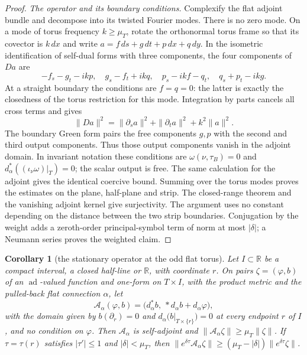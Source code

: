 \documentclass[11pt]{amsart}
\newtheorem{corollary}[theorem]{Corollary}
\theoremstyle{definition}
\theoremstyle{remark}
\theoremstyle{plain}
\numberwithin{equation}{section}
\newcommand{\RR}{\mathbb{R}}
\newcommand{\ad}{\operatorname{ad}}
\begin{document}
\begin{proof}
\emph{The operator and its boundary conditions.}
Complexify the flat adjoint bundle and decompose into its twisted
Fourier modes. There is no zero mode. On a mode of torus frequency
$k\ge\mu_T$, rotate the orthonormal torus frame so that its covector
is $k\,dx$ and write $a=f\,ds+g\,dt+p\,dx+q\,dy$.
In the isometric identification of self-dual forms with three
components, the four components of $Da$ are
\[
-f_s-g_t-ikp,\quad g_s-f_t+ikq,\quad
p_s-ikf-q_t,\quad q_s+p_t-ikg.
\]
At a straight boundary the conditions are $f=q=0$: the latter is
exactly the closedness of the torus restriction for this mode.
Integration by parts cancels all cross terms and gives
\[
\|Da\|^2=\|\partial_sa\|^2+\|\partial_ta\|^2+k^2\|a\|^2.
\]
The boundary Green form pairs the free components $g,p$ with the
second and third output components. Thus those output components
vanish in the adjoint domain. In invariant notation these conditions
are $\omega(\nu,\tau_B)=0$ and
$d_\alpha^*((\iota_\nu\omega)|_T)=0$; the scalar output is free.
The same calculation for the adjoint gives the identical coercive
bound. Summing over the torus modes proves the estimates on the
plane, half-plane and strip. The closed-range theorem and the
vanishing adjoint kernel give surjectivity. The argument uses no
constant depending on the distance between the two strip boundaries.
Conjugation by the weight adds a zeroth-order principal-symbol term
of norm at most $|\delta|$; a Neumann series proves the weighted claim.
\end{proof}

\begin{corollary}[the stationary operator at the odd flat torus]\label{cor:flat-fibre-line}
Let $I\subset\RR$ be a compact interval, a closed half-line or $\RR$, with
coordinate $r$. On pairs $\zeta=(\varphi,b)$ of an $\ad$-valued function and
one-form on $T\times I$, with the product metric and the pulled-back flat
connection $\alpha$, let
\[
\mathcal A_\alpha(\varphi,b)=\bigl(d_\alpha^*b,\ *d_\alpha b+d_\alpha\varphi\bigr),
\]
with the domain given by $b(\partial_r)=0$ and $d_\alpha\bigl(b|_{T\times\{r\}}\bigr)=0$
at every endpoint $r$ of $I$, and no condition on $\varphi$. Then
$\mathcal A_\alpha$ is self-adjoint and $\|\mathcal A_\alpha\zeta\|\ge\mu_T\|\zeta\|$.
If $\tau=\tau(r)$ satisfies $|\tau'|\le1$ and $|\delta|<\mu_T$, then
$\|e^{\delta\tau}\mathcal A_\alpha\zeta\|\ge(\mu_T-|\delta|)\|e^{\delta\tau}\zeta\|$.
\end{corollary}
\end{document}
